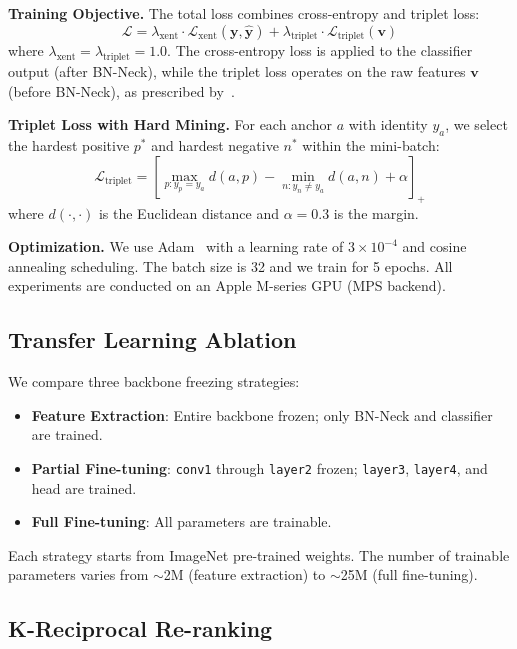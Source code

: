 \documentclass[final]{cvpr}
\begin{document}
\textbf{Training Objective.}
The total loss combines cross-entropy and triplet loss:
\begin{equation}
    \mathcal{L} = \lambda_{\text{xent}} \cdot \mathcal{L}_{\text{xent}}(\mathbf{y}, \hat{\mathbf{y}}) + \lambda_{\text{triplet}} \cdot \mathcal{L}_{\text{triplet}}(\mathbf{v})
\end{equation}
where $\lambda_{\text{xent}} = \lambda_{\text{triplet}} = 1.0$.
The cross-entropy loss is applied to the classifier output (after BN-Neck), while the triplet loss operates on the raw features $\mathbf{v}$ (before BN-Neck), as prescribed by~\cite{luo2019bag}.

\textbf{Triplet Loss with Hard Mining.}
For each anchor $a$ with identity $y_a$, we select the hardest positive $p^*$ and hardest negative $n^*$ within the mini-batch:
\begin{equation}
    \mathcal{L}_{\text{triplet}} = \left[\max_{p: y_p = y_a} d(a, p) - \min_{n: y_n \neq y_a} d(a, n) + \alpha\right]_+
\end{equation}
where $d(\cdot, \cdot)$ is the Euclidean distance and $\alpha = 0.3$ is the margin.

\textbf{Optimization.}
We use Adam~\cite{kingma2015adam} with a learning rate of $3 \times 10^{-4}$ and cosine annealing scheduling.
The batch size is 32 and we train for 5 epochs.
All experiments are conducted on an Apple M-series GPU (MPS backend).

\subsection{Transfer Learning Ablation}

We compare three backbone freezing strategies:
\begin{itemize}
    \item \textbf{Feature Extraction}: Entire backbone frozen; only BN-Neck and classifier are trained.
    \item \textbf{Partial Fine-tuning}: \texttt{conv1} through \texttt{layer2} frozen; \texttt{layer3}, \texttt{layer4}, and head are trained.
    \item \textbf{Full Fine-tuning}: All parameters are trainable.
\end{itemize}
Each strategy starts from ImageNet pre-trained weights.
The number of trainable parameters varies from $\sim$2M (feature extraction) to $\sim$25M (full fine-tuning).

\subsection{K-Reciprocal Re-ranking}
\end{document}
